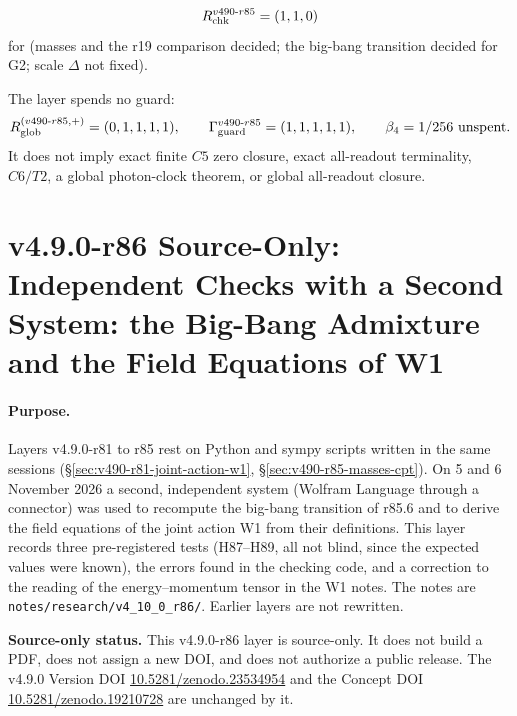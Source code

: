 \[
R_{\rm chk}^{v490\text{-}r85}=(1,1,0)
\]
for (masses and the r19 comparison decided; the big-bang transition decided for G2; scale \(\Delta\) not fixed).

The layer spends no guard:
\[
R_{\rm glob}^{(v490\text{-}r85,+)}=(0,1,1,1,1),
\qquad
\Gamma_{\rm guard}^{v490\text{-}r85}=(1,1,1,1,1),
\qquad
\beta_4=1/256\ \text{unspent}.
\]
It does not imply exact finite \(C5\) zero closure, exact all-readout terminality,
\(C6/T2\), a global photon-clock theorem, or global all-readout closure.

\clearpage
\section*{v4.9.0-r86 Source-Only: Independent Checks with a Second System: the Big-Bang Admixture and the Field Equations of W1}
\label{sec:v490-r86-wolfram-checks}

\paragraph{Purpose.}
Layers v4.9.0-r81 to r85 rest on Python and sympy scripts written in the same sessions (\S\ref{sec:v490-r81-joint-action-w1},
\S\ref{sec:v490-r85-masses-cpt}).  On 5 and 6 November 2026 a second, independent system (Wolfram Language through a connector) was used to
recompute the big-bang transition of r85.6 and to derive the field equations of the joint action W1 from their definitions.  This layer records
three pre-registered tests (H87--H89, all not blind, since the expected values were known), the errors found in the checking code, and a
correction to the reading of the energy--momentum tensor in the W1 notes.  The notes are
\texttt{notes/\allowbreak research/\allowbreak v4\_10\_0\_r86/}.  Earlier layers are not rewritten.

\noindent\textbf{Source-only status.}
This v4.9.0-r86 layer is source-only.  It does not build a PDF, does not assign a new DOI,
and does not authorize a public release.  The v4.9.0 Version DOI
\href{https://doi.org/10.5281/zenodo.23534954}{10.5281/zenodo.23534954} and the Concept DOI
\href{https://doi.org/10.5281/zenodo.19210728}{10.5281/zenodo.19210728} are unchanged by it.

